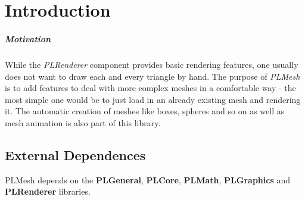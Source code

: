 \chapter{Introduction}


\paragraph{Motivation}
While the \emph{PLRenderer} component provides basic rendering features, one usually does not want to draw each and every triangle by hand. The purpose of \emph{PLMesh} is to add features to deal with more complex meshes in a comfortable way - the most simple one would be to just load in an already existing mesh and rendering it. The automatic creation of meshes like boxes, spheres and so on as well as mesh animation is also part of this library.




\section{External Dependences}
PLMesh depends on the \textbf{PLGeneral}, \textbf{PLCore}, \textbf{PLMath}, \textbf{PLGraphics} and \textbf{PLRenderer} libraries.
